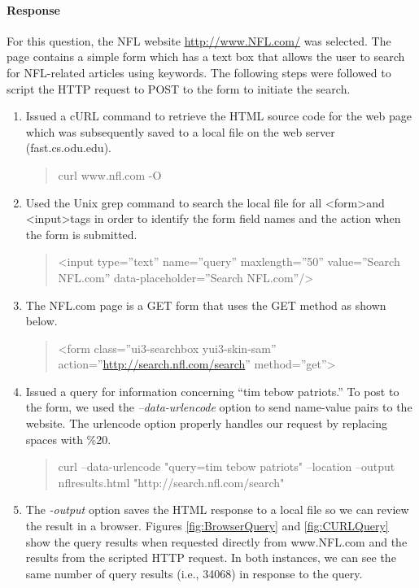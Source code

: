 \documentclass[letterpaper,11pt]{report}
\begin{document}
\begin{savenotes}
\paragraph{Response}For this question, the NFL website \url{http://www.NFL.com/} was selected. The page contains a simple form which has a text box that allows the user to search for NFL-related articles using keywords. The following steps were followed to script the HTTP request to POST to the form to initiate the search.
\begin{enumerate}
\item Issued a cURL command to retrieve the HTML source code for the web page which was subsequently saved to a local file on the web server (fast.cs.odu.edu). 
\begin{quote}
curl www.nfl.com -O
\end{quote}
\item Used the Unix grep command to search the local file for all \textless form\textgreater  and \textless input\textgreater tags in order to identify the form field names and the action when the form is submitted.
\begin{quote}
\textless input type=''text'' name=''query'' maxlength=''50'' value=''Search NFL.com'' data-placeholder=''Search NFL.com''/\textgreater
\end{quote}
\item The NFL.com page is a GET form that uses the GET method as shown below.
\begin{quote} 
\textless form class=''ui3-searchbox yui3-skin-sam'' action=''\url{http://search.nfl.com/search}'' method=''get''\textgreater
\end{quote}
\item Issued a query for information concerning ``tim tebow patriots.'' To post to the form, we used the \emph{--data-urlencode} option to send name-value pairs to the website. The urlencode option properly handles our request by replacing spaces with \%20.
\begin{quote}
curl --data-urlencode "query=tim tebow patriots" --location --output nflresults.html "http://search.nfl.com/search"
\end{quote}
\item The \emph{-output} option saves the HTML response to a local file so we can review the result in a browser. Figures \ref{fig:BrowserQuery} and \ref{fig:CURLQuery} show the query results when requested directly from www.NFL.com and the results from the scripted HTTP request. In both instances, we can see the same number of query results (i.e., 34068) in response to the query.
\end{enumerate}


\end{savenotes}
\end{document}
